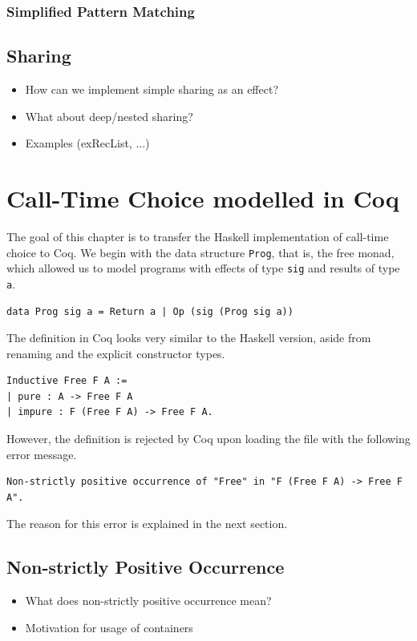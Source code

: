 \documentclass[a4paper, 11pt, fleqn, twoside]{scrreprt}
\newcommand{\hinl}[1]{\texttt{#1}}
\begin{document}
\subsection{Simplified Pattern Matching}


\section{Sharing}
\begin{itemize}
\item How can we implement simple sharing as an effect?
\item What about deep/nested sharing?
\item Examples (exRecList, ...)
\end{itemize}


\chapter{Call-Time Choice modelled in Coq}
\label{ch:callTimeChoiceCoq}
The goal of this chapter is to transfer the Haskell implementation of call-time choice to Coq.
We begin with the data structure \hinl{Prog}, that is, the free monad, which allowed us to model programs with effects of type \hinl{sig} and results of type \hinl{a}.

\begin{verbatim}
data Prog sig a = Return a | Op (sig (Prog sig a))
\end{verbatim}

The definition in Coq looks very similar to the Haskell version, aside from renaming and the explicit constructor types.

\begin{verbatim}
Inductive Free F A :=
| pure : A -> Free F A
| impure : F (Free F A) -> Free F A.
\end{verbatim}

However, the definition is rejected by Coq upon loading the file with the following error message.

\begin{verbatim}
Non-strictly positive occurrence of "Free" in "F (Free F A) -> Free F A".
\end{verbatim}

The reason for this error is explained in the next section.

\section{Non-strictly Positive Occurrence}
\begin{itemize}
\item What does non-strictly positive occurrence mean?
\item Motivation for usage of containers
\end{itemize}
\end{document}
